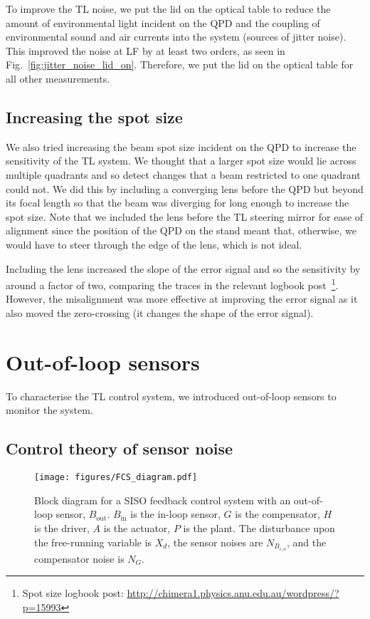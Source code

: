 \documentclass[aps,pra,superscriptaddress,reprint,nofootinbib]{revtex4-1}
\begin{document}
To improve the TL noise, we put the lid on the optical table to reduce the amount of environmental light incident on the QPD and the coupling of environmental sound and air currents into the system (sources of jitter noise). This improved the noise at LF by at least two orders, as seen in Fig.~\ref{fig:jitter_noise_lid_on}. Therefore, we put the lid on the optical table for all other measurements.

\subsection{Increasing the spot size}
\label{sec:spot_size}

We also tried increasing the beam spot size incident on the QPD to increase the sensitivity of the TL system. We thought that a larger spot size would lie across multiple quadrants and so detect changes that a beam restricted to one quadrant could not. We did this by including a converging lens before the QPD but beyond its focal length so that the beam was diverging for long enough to increase the spot size. Note that we included the lens before the TL steering mirror for ease of alignment since the position of the QPD on the stand meant that, otherwise, we would have to steer through the edge of the lens, which is not ideal.

Including the lens increased the slope of the error signal and so the sensitivity by around a factor of two, comparing the traces in the relevant logbook post~\footnote{Spot size logbook post: \url{http://chimera1.physics.anu.edu.au/wordpress/?p=15993}}. However, the misalignment was more effective at improving the error signal as it also moved the zero-crossing (it changes the shape of the error signal).


\section{Out-of-loop sensors}
\label{sec:out-of-loop_sensors}

To characterise the TL control system, we introduced out-of-loop sensors to monitor the system.

\subsection{Control theory of sensor noise}

\begin{figure}
	\texttt{[image: figures/FCS\_diagram.pdf]}
	\caption{Block diagram for a SISO feedback control system with an out-of-loop sensor, $B_{\mathrm{out}}$. $B_{\mathrm{in}}$ is the in-loop sensor, $G$ is the compensator, $H$ is the driver, $A$ is the actuator, $P$ is the plant. The disturbance upon the free-running variable is $X_d$, the sensor noises are $N_{B_{i,o}}$, and the compensator noise is $N_G$.}
	\label{fig:block_FCS_diagram}
\end{figure}
\end{document}
